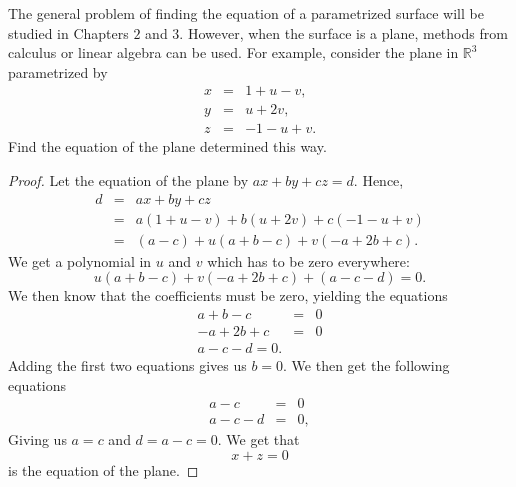 \begin{exercise}{13}
The general problem of finding the equation of a parametrized surface will be studied in Chapters $2$ and $3$. However, when the surface is a plane, methods from calculus or linear algebra can be used. For example, consider the plane in $\mathbb{R}^3$ parametrized by
\begin{eqnarray*}
    x & = & 1 + u - v,\\
    y & = & u + 2v,\\
    z & = & -1 - u + v.
\end{eqnarray*}
Find the equation of the plane determined this way.
\end{exercise}
\begin{proof}
    Let the equation of the plane by $ax+by+cz = d$. Hence,
    \begin{eqnarray*}
        d
        & = & ax+by+cz\\
        & = & a(1+u-v) + b(u + 2v) + c(-1 - u + v)\\
        & = & (a-c) + u(a + b - c) + v(-a + 2b + c).
    \end{eqnarray*}
    We get a polynomial in $u$ and $v$ which has to be zero everywhere:
    $$u(a + b - c) + v(-a + 2b + c) + (a-c-d) = 0.$$
    We then know that the coefficients must be zero, yielding the equations
    \begin{eqnarray*}
        a + b - c & = & 0\\
        -a + 2b + c & = & 0\\
        a -c - d = 0.
    \end{eqnarray*}
    Adding the first two equations gives us $b=0$. We then get the following equations
    \begin{eqnarray*}
        a - c & = & 0\\
        a - c - d & = & 0,
    \end{eqnarray*}
    Giving us $a=c$ and $d = a - c = 0$. We get that
    $$x + z = 0$$
    is the equation of the plane.
\end{proof}

